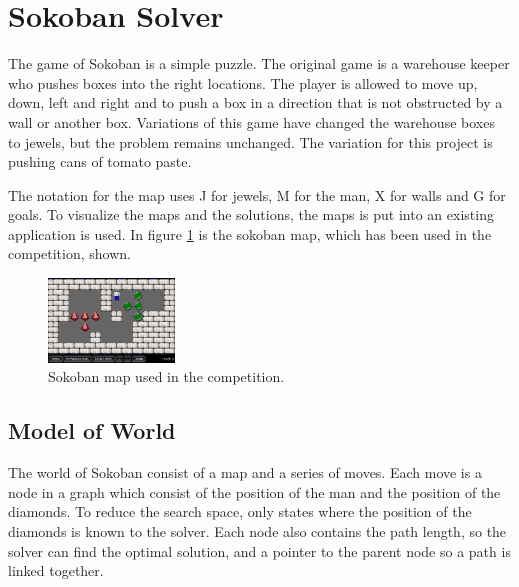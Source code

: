 \section{Sokoban Solver}
The game of Sokoban is a simple puzzle.
The original game is a warehouse keeper who pushes boxes into the right locations.
The player is allowed to move up, down, left and right and to push a box in a direction that is not obstructed by a wall or another box.
Variations of this game have changed the warehouse boxes to jewels, but the problem remains unchanged.
The variation for this project is pushing cans of tomato paste.

The notation for the map uses J for jewels, M for the man, X for walls and G for goals.
To visualize the maps and the solutions, the maps is put into an existing application \cite{url:qml-sokoban} is used.
In figure \ref{fig:sokoban_map_2015_img} is the sokoban map, which has been used in the competition, shown.


%       

\begin{figure}
 \centering
  \includegraphics[width=0.3\textwidth]{img/sokoban_2015}
 \caption{Sokoban map used in the competition.}
 \label{fig:sokoban_map_2015_img}
\end{figure}

\subsection{Model of World}
The world of Sokoban consist of a map and a series of moves.
Each move is a node in a graph which consist of the position of the man and the position of the diamonds.
To reduce the search space, only states where the position of the diamonds is known to the solver.
Each node also contains the path length, so the solver can find the optimal solution, and a pointer to the parent node so a path is linked together.


